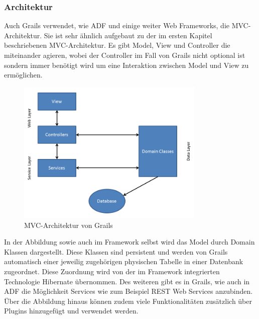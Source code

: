\subsubsection{Architektur}
Auch Grails verwendet, wie ADF und einige weiter Web Frameworks, die MVC-Architektur. Sie ist sehr ähnlich aufgebaut zu der im ersten Kapitel beschriebenen MVC-Architektur. Es gibt Model, View und Controller die miteinander agieren, wobei der Controller im Fall von Grails nicht optional ist sondern immer benötigt wird um eine Interaktion zwischen Model und View zu ermöglichen.\\
\begin{figure}[H]
\centering
\includegraphics[width=0.80\textwidth]{img/Folie1.png}
\caption {MVC-Architektur von Grails}
\end{figure}
In der Abbildung sowie auch im Framework selbst wird das Model durch Domain Klassen dargestellt. Diese Klassen sind persistent und werden von Grails automatisch einer jeweilig zugehörigen physischen Tabelle in einer Datenbank zugeordnet. Diese Zuordnung wird von der im Framework integrierten Technologie Hibernate übernommen. Des weiteren gibt es in Grails, wie auch in ADF die Möglichkeit Services wie zum Beispiel REST Web Services anzubinden. Über die Abbildung hinaus können zudem viele Funktionalitäten zusätzlich über Plugins hinzugefügt und verwendet werden.\\

